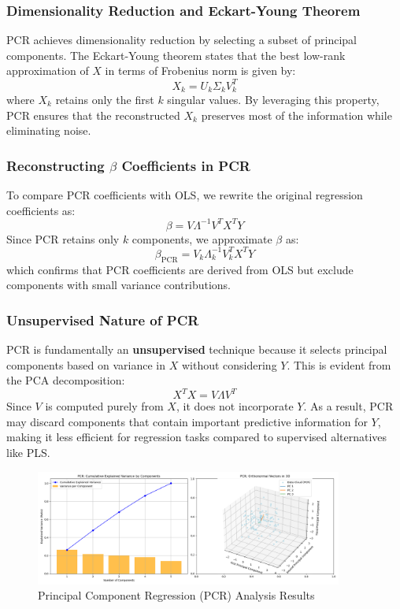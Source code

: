 \documentclass[11pt,twoside,a4paper]{article}
\begin{document}
\subsubsection{Dimensionality Reduction and Eckart-Young Theorem}
PCR achieves dimensionality reduction by selecting a subset of principal components. The Eckart-Young theorem states that the best low-rank approximation of \( X \) in terms of Frobenius norm is given by:
\[
X_k = U_k \Sigma_k V_k^T
\]
where \( X_k \) retains only the first \( k \) singular values. By leveraging this property, PCR ensures that the reconstructed \( X_k \) preserves most of the information while eliminating noise.

\subsubsection{Reconstructing \( \beta \) Coefficients in PCR}
To compare PCR coefficients with OLS, we rewrite the original regression coefficients as:
\[
\beta = V \Lambda^{-1} V^T X^T Y
\]
Since PCR retains only \( k \) components, we approximate \( \beta \) as:
\[
\beta_{\text{PCR}} = V_k \Lambda_k^{-1} V_k^T X^T Y
\]
which confirms that PCR coefficients are derived from OLS but exclude components with small variance contributions.

\subsubsection{Unsupervised Nature of PCR}
PCR is fundamentally an \textbf{unsupervised} technique because it selects principal components based on variance in \( X \) without considering \( Y \). This is evident from the PCA decomposition:
\[
X^T X = V \Lambda V^T
\]
Since \( V \) is computed purely from \( X \), it does not incorporate \( Y \). As a result, PCR may discard components that contain important predictive information for \( Y \), making it less efficient for regression tasks compared to supervised alternatives like PLS.

\begin{figure}[H]
    \centering
    \includegraphics[width=0.9\textwidth]{PCR_Selected_Analysis.png}
    \caption{Principal Component Regression (PCR) Analysis Results}
    \label{fig:PCR_analysis}
\end{figure}
\end{document}
